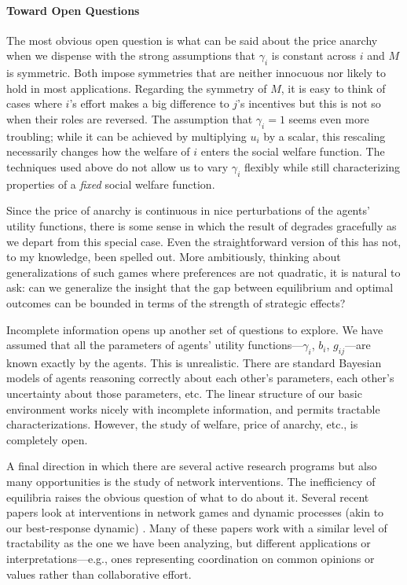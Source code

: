 \documentclass{notices}
\theoremstyle{definition}\newtheorem{problem}{Problem}
\begin{document}
\paragraph{Toward Open Questions}

The most obvious open question is what can be said about the price anarchy when we dispense with the strong assumptions that $\gamma_i$ is constant across $i$ and $M$ is symmetric. Both impose symmetries that are neither innocuous nor likely to hold in most applications. Regarding the symmetry of $M$, it is easy to think of cases where $i$'s effort makes a big difference to $j$'s incentives but this is not so when their roles are reversed. The assumption that $\gamma_i=1$ seems even more troubling; while it can be achieved by multiplying $u_i$ by a scalar, this rescaling necessarily changes how the welfare of $i$ enters the social welfare function. The techniques used above do not allow us to vary $\gamma_i$ flexibly while still characterizing properties of a \emph{fixed} social welfare function.

Since the price of anarchy is continuous in nice perturbations of the agents' utility functions, there is some sense in which the result of  degrades gracefully as we depart from this special case. Even the straightforward version of this has not, to my knowledge, been spelled out. More ambitiously, thinking about generalizations of such games where preferences are not quadratic, it is natural to ask: can we generalize the insight that the gap between equilibrium and optimal outcomes can be bounded in terms of the strength of strategic effects? 

Incomplete information opens up another set of questions to explore. We have assumed that all the parameters of agents' utility functions---$\gamma_i$, $b_i$, $g_{ij}$---are known exactly by the agents. This is unrealistic. There are standard Bayesian models of   agents reasoning correctly about each other's parameters, each other's uncertainty about those parameters, etc. The linear structure of our basic environment works nicely with incomplete information, and permits tractable characterizations. However, the study of welfare, price of anarchy, etc., is completely open. 

A final direction in which there are several active research programs but also many opportunities is the study of network interventions. The inefficiency of equilibria raises the obvious question of what to do about it. Several recent papers look at interventions in network games and dynamic processes (akin to our best-response dynamic) \cite{gaitonde2020adversarial,GaleottiGolubGoyal2020,JeongShin2024}. Many of these papers work with a similar level of tractability as the one we have been analyzing, but different applications or interpretations---e.g., ones representing coordination on common opinions or values rather than collaborative effort.
\end{document}
